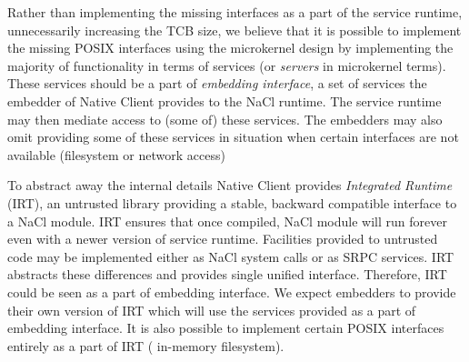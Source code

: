 Rather than implementing the missing interfaces as a part of the service
runtime, unnecessarily increasing the TCB size, we believe that it is
possible to implement the missing POSIX interfaces using the microkernel
design by implementing the majority of functionality in terms of
services (or \emph{servers} in microkernel terms).  These services
should be a part of \emph{embedding interface}, a set of services the
embedder of Native Client provides to the NaCl runtime. The service
runtime may then mediate access to (some of) these services. The
embedders may also omit providing some of these services in situation
when certain interfaces are not available (\eg filesystem or network
access)

To abstract away the internal details Native Client provides
\emph{Integrated Runtime} (IRT), an untrusted library providing a
stable, backward compatible interface to a NaCl module. IRT ensures that
once compiled, NaCl module will run forever even with a newer version of
service runtime. Facilities provided to untrusted code may be
implemented either as NaCl system calls or as SRPC services. IRT
abstracts these differences and provides single unified interface.
Therefore, IRT could be seen as a part of embedding interface. We expect
embedders to provide their own version of IRT which will use the
services provided as a part of embedding interface. It is also possible
to implement certain POSIX interfaces entirely as a part of IRT (\eg
in-memory filesystem).





